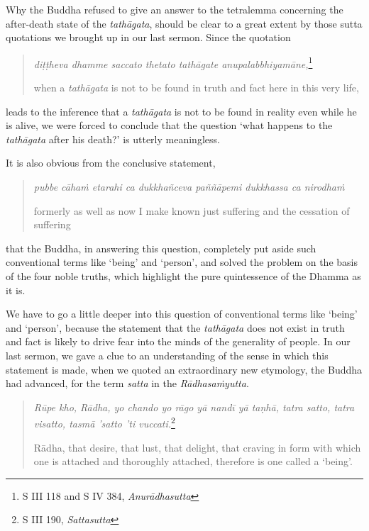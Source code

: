 Why the Buddha refused to give an answer to the tetralemma concerning the after-death state of the \emph{tathāgata}, should be clear to a great extent by those sutta quotations we brought up in our last sermon. Since the quotation

\begin{quote}
\emph{diṭṭheva dhamme saccato thetato tathāgate anupalabbhiyamāne,}\footnote{S III 118 and S IV 384, \emph{Anurādhasutta}}

when a \emph{tathāgata} is not to be found in truth and fact here in this very life,
\end{quote}

leads to the inference that a \emph{tathāgata} is not to be found in reality even while he is alive, we were forced to conclude that the question `what happens to the \emph{tathāgata} after his death?' is utterly meaningless.

It is also obvious from the conclusive statement,

\begin{quote}
\emph{pubbe cāhaṁ etarahi ca dukkhañceva paññāpemi dukkhassa ca nirodhaṁ}

formerly as well as now I make known just suffering and the cessation of suffering
\end{quote}

that the Buddha, in answering this question, completely put aside such conventional terms like `being' and `person', and solved the problem on the basis of the four noble truths, which highlight the pure quintessence of the Dhamma as it is.

We have to go a little deeper into this question of conventional terms like `being' and `person', because the statement that the \emph{tathāgata} does not exist in truth and fact is likely to drive fear into the minds of the generality of people. In our last sermon, we gave a clue to an understanding of the sense in which this statement is made, when we quoted an extraordinary new etymology, the Buddha had advanced, for the term \emph{satta} in the \emph{Rādhasaṁyutta}.

\begin{quote}
\emph{Rūpe kho, Rādha, yo chando yo rāgo yā nandī yā taṇhā, tatra satto, tatra visatto, tasmā 'satto 'ti vuccati.}\footnote{S III 190, \emph{Sattasutta}}

Rādha, that desire, that lust, that delight, that craving in form with which one is attached and thoroughly attached, therefore is one called a `being'.
\end{quote}

